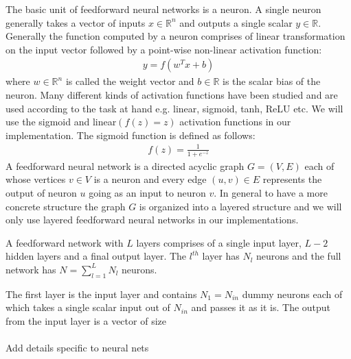 The basic unit of feedforward neural networks is a neuron. A single neuron generally takes a vector of inputs $x \in \mathbb{R}^n$ and outputs a single scalar $y \in \mathbb{R}$. Generally the function computed by a neuron comprises of linear transformation on the input vector followed by a point-wise non-linear activation function:
\begin{align}
y = f(w^T x + b)
\end{align}
where $w \in \mathbb{R}^n$ is called the weight vector and $b \in \mathbb{R}$ is the scalar bias of the neuron.
Many different kinds of activation functions have been studied and are used according to the task at hand e.g. linear, sigmoid, tanh, ReLU etc. We will use the sigmoid and linear$(f(z) = z)$ activation functions in our implementation.
The sigmoid function is defined as follows:
\begin{align}
f(z) = \frac{1}{1 + e^{-z}}
\end{align}
A feedforward neural network is a directed acyclic graph $G = (V,E)$ each of whose vertices $v \in V$ is a neuron and every edge $(u,v) \in E$ represents the output of neuron $u$ going as an input to neuron $v$. In general to have a more concrete structure the graph $G$ is organized into a layered structure and we will only use layered feedforward neural networks in our implementations.

A feedforward network with $L$ layers comprises of a single input layer, $L-2$ hidden layers and a final output layer.
The $l^{th}$ layer has $N_l$ neurons and the full network has $N = \sum_{l=1}^L N_l$ neurons.

The first layer is the input layer and contains $N_1 = N_{in}$ dummy neurons each of which takes a single scalar input out of $N_{in}$ and passes it as it is.
The output from the input layer is a vector of size
\\
\\
Add details specific to neural nets
